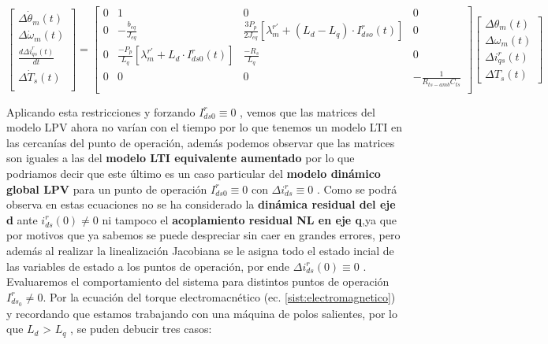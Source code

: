 \documentclass[10pt]{article}
\begin{document}
\begin{enumerate}
	 \begin{equation}
		\begin{bmatrix}
	\Delta \dot{\theta}_{m}(t)\\
	\Delta \dot{\omega}_{m}(t)
	\\ 
	\frac{d \Delta i^{r}_{qs}(t)}{dt}\\
	\Delta \dot{T}_{s}(t)\\
	\end{bmatrix}
	=
	\begin{bmatrix}
		0 & 1 &0 &0  \\ 
		0 & -\frac{b_{eq}}{J_{eq}} & \frac{3 P_{p}}{2 J_{eq}}[ \lambda^{r'}_{m}+\left ( L_{d}-L_{q} \right )\cdot I_{dso}^{r} (t)]&0 \\ 
		0  & \frac{- P_{p} }{ L_{q}} [\lambda^{r'}_{m}+L_{d}\cdot I^{r}_{ds0}(t)]& \frac{-R_{s}}{L_{q}}&0\\
		0 & 0 & 0 & -\frac{1}{R_{ts-amb} C_{ts}}\\
		\end{bmatrix} 
	\begin{bmatrix}
	\Delta \theta_{m}(t)\\
	\Delta \omega_{m}(t)
	\\ 
	\Delta i^{r}_{qs}(t)\\
	\Delta T_{s}(t)
	\end{bmatrix}
	\label{eq:2.1.2.f.1}
	\end{equation}
	
	Aplicando esta restricciones y forzando $I^{r}_{ds0} \equiv 0$ , vemos que las matrices del modelo LPV ahora no varían con el tiempo por lo que tenemos un modelo LTI en las cercanías del punto de operación, además podemos observar que las matrices son iguales a las del \textbf{modelo LTI equivalente aumentado} por lo que podriamos decir que este último es un caso particular  del \textbf{modelo dinámico global LPV} para un punto de operación $I^{r}_{ds0} \equiv 0$  con $\Delta i^{r}_{ds} \equiv 0$ . Como se podrá observa en estas ecuaciones no se ha considerado la \textbf{dinámica residual del eje d} ante $i^{r}_{ds}(0)\neq 0$ ni tampoco el \textbf{acoplamiento residual NL en eje q},ya que por motivos que ya sabemos se puede despreciar sin caer en grandes errores, pero además al realizar la linealización Jacobiana se le asigna todo el estado incial de las variables de estado a los puntos de operación, por ende $\Delta i^{r}_{ds}(0) \equiv 0$  . \\
	Evaluaremos el comportamiento del sistema para distintos puntos de operación $I^{r}_{ds_{0}}\neq 0$. Por la ecuación del torque electromacnético (ec. \ref{sist:electromagnetico}) y recordando que estamos trabajando con una máquina de polos salientes, por lo que $L_{d}$ > $L_{q}$ , se puden debucir tres casos:
	

\end{enumerate}
\end{document}
